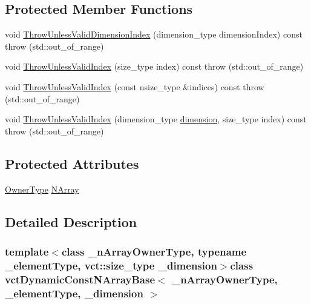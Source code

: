 \subsection*{Protected Member Functions}
\begin{DoxyCompactItemize}
\item 
void \hyperlink{classvct_dynamic_const_n_array_base_aa013dfd6230be4f7fc869c1daf7515d3}{Throw\-Unless\-Valid\-Dimension\-Index} (dimension\-\_\-type dimension\-Index) const   throw (std\-::out\-\_\-of\-\_\-range)
\item 
void \hyperlink{classvct_dynamic_const_n_array_base_ad6647ba0b75ea6f4a193a1875e2f889e}{Throw\-Unless\-Valid\-Index} (size\-\_\-type index) const   throw (std\-::out\-\_\-of\-\_\-range)
\item 
void \hyperlink{classvct_dynamic_const_n_array_base_a6839a681cfa524a736063cdda00ac1ca}{Throw\-Unless\-Valid\-Index} (const nsize\-\_\-type \&indices) const   throw (std\-::out\-\_\-of\-\_\-range)
\item 
void \hyperlink{classvct_dynamic_const_n_array_base_a58d91c9a444c8af1f9705c319976eafd}{Throw\-Unless\-Valid\-Index} (dimension\-\_\-type \hyperlink{classvct_dynamic_const_n_array_base_aad976ad48dc9b1006d9e2729195f0b7c}{dimension}, size\-\_\-type index) const   throw (std\-::out\-\_\-of\-\_\-range)
\end{DoxyCompactItemize}
\subsection*{Protected Attributes}
\begin{DoxyCompactItemize}
\item 
\hyperlink{classvct_dynamic_const_n_array_base_aad4328d01dc43be4b9047d594ed2ae8d}{Owner\-Type} \hyperlink{classvct_dynamic_const_n_array_base_abab29addf55644fbec7540399d586874}{N\-Array}
\end{DoxyCompactItemize}


\subsection{Detailed Description}
\subsubsection*{template$<$class \-\_\-n\-Array\-Owner\-Type, typename \-\_\-element\-Type, vct\-::size\-\_\-type \-\_\-dimension$>$class vct\-Dynamic\-Const\-N\-Array\-Base$<$ \-\_\-n\-Array\-Owner\-Type, \-\_\-element\-Type, \-\_\-dimension $>$}

